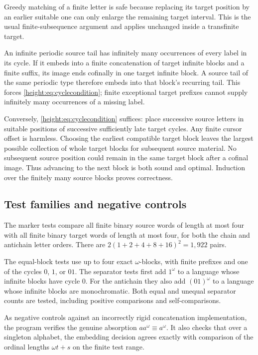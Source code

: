 \documentclass[11pt,a4paper]{article}
\numberwithin{equation}{section}
\theoremstyle{definition}
\theoremstyle{remark}
\begin{document}
Greedy matching of a finite letter is safe because replacing its target
position by an earlier suitable one can only enlarge the remaining
target interval. This is the usual finite-subsequence argument and
applies unchanged inside a transfinite target.

An infinite periodic source tail has infinitely many occurrences of
every label in its cycle. If it embeds into a finite concatenation of
target infinite blocks and a finite suffix, its image ends cofinally
in one target infinite block. A source tail of the same periodic type
therefore embeds into that block's recurring tail. This forces
\eqref{height:eq:cyclecondition}; finite exceptional target prefixes cannot
supply infinitely many occurrences of a missing label.

Conversely, \eqref{height:eq:cyclecondition} suffices: place successive source
letters in suitable positions of successive sufficiently late target
cycles. Any finite cursor offset is harmless. Choosing the earliest
compatible target block leaves the largest possible collection of
whole target blocks for subsequent source material. No subsequent
source position could remain in the same target block after a cofinal
image. Thus advancing to the next block is both sound and optimal.
Induction over the finitely many source blocks proves correctness.

\subsection{Test families and negative controls}

The marker tests compare all finite binary source words of length at
most four with all finite binary target words of length at most four,
for both the chain and antichain letter orders. There are
$2(1+2+4+8+16)^2=1{,}922$ pairs.

The equal-block tests use up to four exact $\omega$-blocks, with finite
prefixes and one of the cycles $0$, $1$, or $01$. The separator tests
first add $1^\omega$ to a language whose infinite blocks have cycle $0$.
For the antichain they also add $(01)^\omega$ to a language whose infinite
blocks are monochromatic. Both equal and unequal separator counts are
tested, including positive comparisons and self-comparisons.

As negative controls against an incorrectly rigid concatenation
implementation, the program verifies the genuine absorption
$a a^\omega\equiv a^\omega$. It also checks that over a singleton
alphabet, the embedding decision agrees exactly with comparison of the
ordinal lengths $\omega t+s$ on the finite test range.
\end{document}

